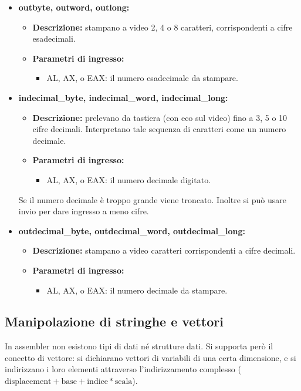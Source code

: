 \documentclass[a4paper,11pt]{article}
\begin{document}
\begin{itemize}
	\item \textbf{outbyte, outword, outlong:}
		\begin{itemize}
		\item \textbf{Descrizione:} stampano a video 2, 4 o 8 caratteri, corrispondenti a cifre esadecimali.
		\item \textbf{Parametri di ingresso:} 
			\begin{itemize}
				\item AL, AX, o EAX: il numero esadecimale da stampare.
			\end{itemize}
		\end{itemize}


	\item \textbf{indecimal\_byte, indecimal\_word, indecimal\_long:}
		\begin{itemize}
		\item \textbf{Descrizione:} prelevano da tastiera (con eco sul video) fino a 3, 5 o 10 cifre decimali.
			Interpretano tale sequenza di caratteri come un numero decimale.
		\item \textbf{Parametri di ingresso:} 
			\begin{itemize}
				\item AL, AX, o EAX: il numero decimale digitato.
			\end{itemize}
		\end{itemize}
	Se il numero decimale è troppo grande viene troncato.
	Inoltre si può usare invio per dare ingresso a meno cifre.

	
	\item \textbf{outdecimal\_byte, outdecimal\_word, outdecimal\_long:}
		\begin{itemize}
		\item \textbf{Descrizione:} stampano a video caratteri corrispondenti a cifre decimali.
		\item \textbf{Parametri di ingresso:} 
			\begin{itemize}
				\item AL, AX, o EAX: il numero decimale da stampare.
			\end{itemize}
		\end{itemize}

\end{itemize}

\subsection{Manipolazione di stringhe e vettori}
In assembler non esistono tipi di dati né strutture dati.
Si supporta però il concetto di vettore: si dichiarano vettori di variabili di una certa dimensione, e si indirizzano i loro elementi attraverso l'indirizzamento complesso ($\text{displacement} + \text{base} + \text{indice} * \text{scala}$).
\end{document}
